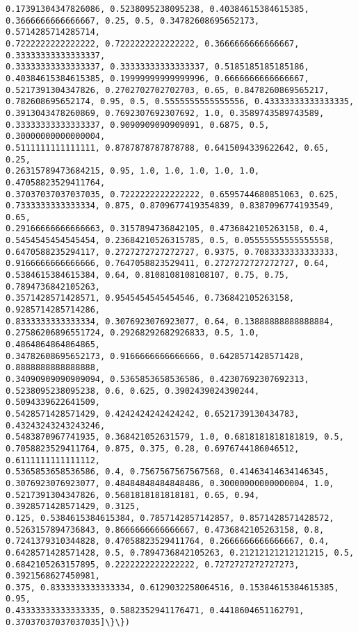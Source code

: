 \documentclass[11pt]{article}
\begin{document}
\begin{Verbatim}[commandchars=\\\{\}]
0.17391304347826086, 0.5238095238095238, 0.40384615384615385,
0.3666666666666667, 0.25, 0.5, 0.34782608695652173, 0.5714285714285714,
0.7222222222222222, 0.7222222222222222, 0.3666666666666667, 0.33333333333333337,
0.33333333333333337, 0.33333333333333337, 0.5185185185185186,
0.40384615384615385, 0.19999999999999996, 0.6666666666666667,
0.5217391304347826, 0.2702702702702703, 0.65, 0.8478260869565217,
0.782608695652174, 0.95, 0.5, 0.5555555555555556, 0.43333333333333335,
0.3913043478260869, 0.7692307692307692, 1.0, 0.3589743589743589,
0.33333333333333337, 0.9090909090909091, 0.6875, 0.5, 0.30000000000000004,
0.5111111111111111, 0.8787878787878788, 0.6415094339622642, 0.65, 0.25,
0.26315789473684215, 0.95, 1.0, 1.0, 1.0, 1.0, 1.0, 0.47058823529411764,
0.37037037037037035, 0.7222222222222222, 0.6595744680851063, 0.625,
0.7333333333333334, 0.875, 0.8709677419354839, 0.8387096774193549, 0.65,
0.29166666666666663, 0.3157894736842105, 0.4736842105263158, 0.4,
0.5454545454545454, 0.23684210526315785, 0.5, 0.05555555555555558,
0.6470588235294117, 0.2727272727272727, 0.9375, 0.7083333333333333,
0.9166666666666666, 0.7647058823529411, 0.2727272727272727, 0.64,
0.5384615384615384, 0.64, 0.8108108108108107, 0.75, 0.75, 0.7894736842105263,
0.3571428571428571, 0.9545454545454546, 0.736842105263158, 0.9285714285714286,
0.8333333333333334, 0.3076923076923077, 0.64, 0.13888888888888884,
0.27586206896551724, 0.29268292682926833, 0.5, 1.0, 0.4864864864864865,
0.34782608695652173, 0.9166666666666666, 0.6428571428571428, 0.8888888888888888,
0.34090909090909094, 0.5365853658536586, 0.42307692307692313,
0.5238095238095238, 0.6, 0.625, 0.3902439024390244, 0.5094339622641509,
0.5428571428571429, 0.4242424242424242, 0.6521739130434783, 0.43243243243243246,
0.5483870967741935, 0.368421052631579, 1.0, 0.6818181818181819, 0.5,
0.7058823529411764, 0.875, 0.375, 0.28, 0.6976744186046512, 0.6111111111111112,
0.5365853658536586, 0.4, 0.7567567567567568, 0.41463414634146345,
0.3076923076923077, 0.48484848484848486, 0.30000000000000004, 1.0,
0.5217391304347826, 0.5681818181818181, 0.65, 0.94, 0.3928571428571429, 0.3125,
0.125, 0.5384615384615384, 0.7857142857142857, 0.8571428571428572,
0.5263157894736843, 0.8666666666666667, 0.4736842105263158, 0.8,
0.7241379310344828, 0.47058823529411764, 0.2666666666666667, 0.4,
0.6428571428571428, 0.5, 0.7894736842105263, 0.21212121212121215, 0.5,
0.6842105263157895, 0.2222222222222222, 0.7272727272727273, 0.3921568627450981,
0.375, 0.8333333333333334, 0.6129032258064516, 0.15384615384615385, 0.95,
0.43333333333333335, 0.5882352941176471, 0.4418604651162791,
0.37037037037037035]\}\})
    \end{Verbatim}
\end{document}
